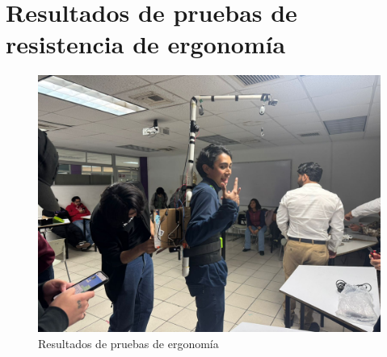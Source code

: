 \section{Resultados de pruebas de resistencia de ergonomía}
\begin{figure}[H]
    \centering
    \includegraphics[width=1\textwidth]{img/PruebaErgonomica1.png}
    \caption{Resultados de pruebas de ergonomía}
    \label{fig:ergo-test1}
\end{figure}

